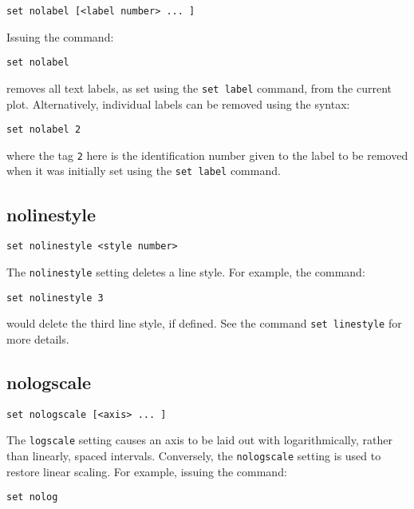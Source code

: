 \begin{verbatim}
set nolabel [<label number> ... ]
\end{verbatim}

Issuing the command:

\begin{verbatim}
set nolabel
\end{verbatim}

\noindent removes all text labels, as set using the {\tt set label} command,
from the current plot. Alternatively, individual labels can be removed using
the syntax:

\begin{verbatim}
set nolabel 2
\end{verbatim}

\noindent where the tag {\tt 2} here is the identification number given to
the label to be removed when it was initially set using the {\tt set label}
command.

\subsection{nolinestyle}

\begin{verbatim}
set nolinestyle <style number>
\end{verbatim}

The {\tt nolinestyle} setting deletes a line style. For example, the command:

\begin{verbatim}
set nolinestyle 3
\end{verbatim}

\noindent would delete the third line style, if defined. See the command {\tt set
linestyle} for more details.


\subsection{nologscale}

\begin{verbatim}
set nologscale [<axis> ... ]
\end{verbatim}

The {\tt logscale} setting causes an axis to be laid out with logarithmically,
rather than linearly, spaced intervals. Conversely, the {\tt nologscale} setting
is used to restore linear scaling. For example, issuing the command:

\begin{verbatim}
set nolog 
\end{verbatim}

